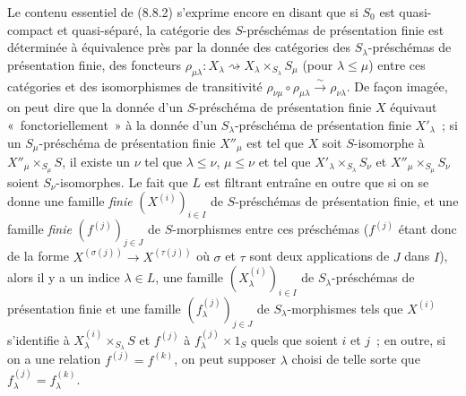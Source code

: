\begin{env}[8.8.3]
\label{IV.8.8.3-fr}
Le contenu essentiel de (8.8.2) s'exprime encore en disant que si $S_0$ est
quasi-compact et quasi-séparé, la catégorie des $S$-préschémas de présentation
finie est déterminée à équivalence près par la donnée des catégories des
$S_\lambda$-préschémas de présentation finie, des foncteurs
$\rho_{\mu\lambda}:X_\lambda\rightsquigarrow
X_\lambda\times_{S_\lambda}S_\mu$ (pour $\lambda\leq\mu$) entre ces catégories
et des isomorphismes de transitivité
$\rho_{\nu\mu}\circ\rho_{\mu\lambda}\xrightarrow{\sim}\rho_{\nu\lambda}$. De
façon imagée, on peut dire que la donnée d'un $S$-préschéma de présentation
finie $X$ équivaut «~fonctoriellement~» à la donnée d'un
$S_\lambda$-préschéma de présentation finie $X'_\lambda$~; si un
$S_\mu$-préschéma de présentation finie $X''_\mu$ est tel que $X$ soit
$S$-isomorphe à $X''_\mu\times_{S_\mu}S$, il existe un $\nu$ tel que
$\lambda\leq\nu$, $\mu\leq\nu$ et tel que
$X'_\lambda\times_{S_\lambda}S_\nu$ et
$X''_\mu\times_{S_\mu}S_\nu$ soient $S_\nu$-isomorphes. Le fait que $L$ est
filtrant entraîne en outre que si on se donne une famille \emph{finie}
$(X^{(i)})_{i\in I}$ de $S$-préschémas de présentation finie, et une famille
\emph{finie} $(f^{(j)})_{j\in J}$ de $S$-morphismes entre ces préschémas
($f^{(j)}$ étant donc de la forme
$X^{(\sigma(j))}\to X^{(\tau(j))}$ où $\sigma$ et $\tau$ sont deux
applications de $J$ dans $I$), alors il y a un indice $\lambda\in L$, une
famille $(X_\lambda^{(i)})_{i\in I}$ de $S_\lambda$-préschémas de présentation
finie et une famille $(f_\lambda^{(j)})_{j\in J}$ de $S_\lambda$-morphismes
tels que $X^{(i)}$ s'identifie à
$X_\lambda^{(i)}\times_{S_\lambda}S$ et $f^{(j)}$ à
$f_\lambda^{(j)}\times1_S$ quels que soient $i$ et $j$~; en outre, si on a
une relation $f^{(j)}=f^{(k)}$, on peut supposer $\lambda$ choisi de telle
sorte que $f_\lambda^{(j)}=f_\lambda^{(k)}$.


\end{env}

